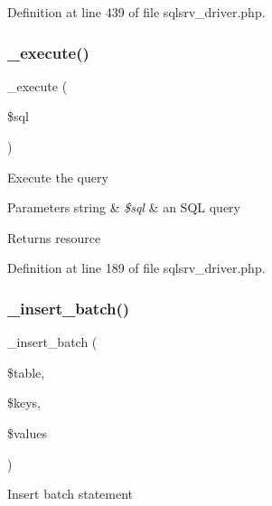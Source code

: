 Definition at line 439 of file sqlsrv\+\_\+driver.\+php.

\mbox{\label{class_c_i___d_b__sqlsrv__driver_a114ab675d89bf8324a41785fb475e86d}} 
\subsubsection{\texorpdfstring{\_execute()}{\_execute()}}
{\footnotesize\ttfamily \+\_\+execute (\begin{DoxyParamCaption}\item[{}]{\$sql }\end{DoxyParamCaption})\hspace{0.3cm}{\ttfamily [protected]}}

Execute the query


\begin{DoxyParams}[1]{Parameters}
string & {\em \$sql} & an S\+QL query \\
\hline
\end{DoxyParams}
\begin{DoxyReturn}{Returns}
resource 
\end{DoxyReturn}


Definition at line 189 of file sqlsrv\+\_\+driver.\+php.

\mbox{\label{class_c_i___d_b__sqlsrv__driver_a1978e1358c812587a46e242630365099}} 
\subsubsection{\texorpdfstring{\_insert\_batch()}{\_insert\_batch()}}
{\footnotesize\ttfamily \+\_\+insert\+\_\+batch (\begin{DoxyParamCaption}\item[{}]{\$table,  }\item[{}]{\$keys,  }\item[{}]{\$values }\end{DoxyParamCaption})\hspace{0.3cm}{\ttfamily [protected]}}

Insert batch statement


